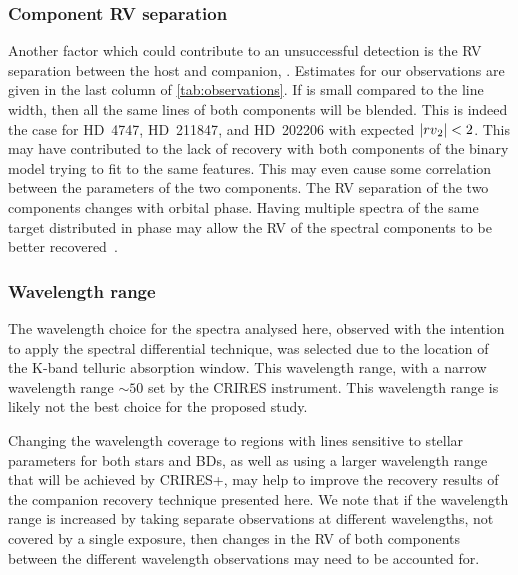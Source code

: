 \subsubsection{Component {RV} separation}
\label{subsubsec:rv_seperation}
Another factor which could contribute to an unsuccessful detection is the {RV} separation between the host and companion, \Rvtwo{}.
Estimates for our observations are given in the last column of \cref{tab:observations}.
If \Rvtwo{} is small compared to the line width, then all the same lines of both components will be blended.
This is indeed the case for {HD~4747}, {HD~211847}, and {HD~202206} with expected \(|{rv{}}_{2}{}| < 2\)\kmps{}.
This may have contributed to the lack of recovery with both components of the binary model trying to fit to the same features.
This may even cause some correlation between the parameters of the two components.
The {RV} separation of the two components changes with orbital phase.
Having multiple spectra of the same target distributed in phase may allow the {RV} of the spectral components to be better recovered~\citep [e.g. ][]{czekala_disentangling_2017, sablowski_spectral_2016}.


\subsubsection {Wavelength range}
\label{subsubsec:wavelenght_range_limitation}
The wavelength choice for the spectra analysed here, observed with the intention to apply the spectral differential technique, was selected due to the location of the K-band telluric absorption window.
This wavelength range, with a narrow wavelength range \(\sim50\)\nm{} set by the CRIRES instrument.
This wavelength range is likely not the best choice for the proposed study.

Changing the wavelength coverage to regions with lines sensitive to stellar parameters for both stars and {BD}s, as well as using a larger wavelength range that will be achieved by CRIRES+, may help to improve the recovery results of the companion recovery technique presented here.
We note that if the wavelength range is increased by taking separate observations at different wavelengths, not covered by a single exposure, then changes in the {RV} of both components between the different wavelength observations may need to be accounted for.


